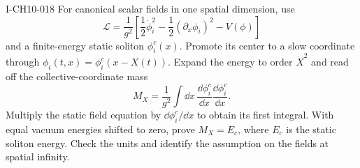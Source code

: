 \begin{exercise}{I-CH10-018}
For canonical scalar fields in one spatial dimension, use
\[
  \mathcal L=\frac1{g^2}\left[
  \frac12\dot\phi_i^2-\frac12(\partial_x\phi_i)^2-V(\phi)\right]
\]
and a finite-energy static soliton $\phi_i^c(x)$.  Promote its center to a
slow coordinate through $\phi_i(t,x)=\phi_i^c(x-X(t))$.  Expand the energy to
order $\dot X^2$ and read off the collective-coordinate mass
\[
  M_X=\frac1{g^2}\int\dd x\,
  \frac{\dd\phi_i^c}{\dd x}\frac{\dd\phi_i^c}{\dd x}.
\]
Multiply the static field equation by $\dd\phi_i^c/\dd x$ to obtain its first
integral.  With equal vacuum energies shifted to zero, prove $M_X=E_c$, where
$E_c$ is the static soliton energy.  Check the units and identify the
assumption on the fields at spatial infinity.
\end{exercise}
